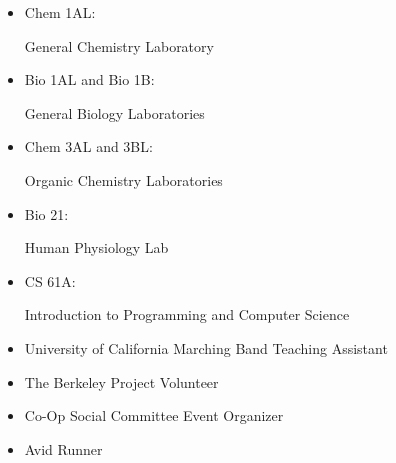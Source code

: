 \vspace*{-1em}  %


\begin{itemize}
	\item Chem 1AL:
	
	General Chemistry Laboratory
	\item Bio 1AL and Bio 1B: 
	
	General Biology Laboratories
	\item Chem 3AL and 3BL: 
	
	Organic Chemistry Laboratories
	\item Bio 21: 
	
	Human Physiology Lab
	\item CS 61A: 
	
	Introduction to Programming and Computer Science
\end{itemize}

\begin{itemize}
	\item University of California Marching Band Teaching Assistant
	\item The Berkeley Project Volunteer
	\item Co-Op Social Committee Event Organizer
	\item Avid Runner
\end{itemize}